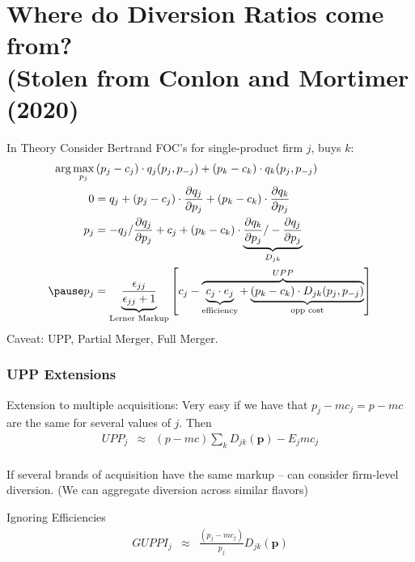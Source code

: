 \documentclass[xcolor=pdftex,dvipsnames,table,mathserif,aspectratio=169]{beamer}
\begin{document}
\section{Where do Diversion Ratios come from?\\ (Stolen from Conlon and Mortimer (2020)}
\begin{frame}{In Theory}
\footnotesize
Consider Bertrand FOC's for single-product firm $j$, buys $k$:
\begin{align*}
\arg \max_{p_j}&\, (p_j-c_j) \cdot q_j(p_j,p_{-j}) + (p_k-c_k) \cdot q_k(p_j,p_{-j})\\
0 &=q_j+ (p_j-c_j) \cdot \frac{\partial q_j}{\partial p_j}+ (p_k-c_k) \cdot  \frac{\partial q_k}{\partial p_j}\\
p_j &=-q_j/\frac{\partial q_j}{\partial p_j}+ c_j + (p_k-c_k) \cdot  \underbrace{\frac{\partial q_k}{\partial p_j}/-\frac{\partial q_j}{\partial p_j}}_{D_{jk}}\\ \pause
p_j &= \underbrace{\frac{\epsilon_{jj}}{\epsilon_{jj}+1}}_{\text{Lerner Markup}} \left[  c_j -\overbrace{ \underbrace{c_j \cdot e_j}_{\text{efficiency}} + \underbrace{(p_k-c_k) \cdot  D_{jk} (p_j,p_{-j})}_{\text{opp cost}}}^{UPP} \right]\\
\end{align*}
Caveat: UPP, Partial Merger, Full Merger.
\end{frame}


\begin{frame}
\frametitle{UPP Extensions}
\begin{block}{Extension to multiple acquisitions:}
Very easy if we have that $p_j - mc_j = p - mc$ are the same for several values of $j$.  Then
\begin{eqnarray*}
UPP_j &\approx& (p - mc) \sum_k D_{jk}(\mathbf{p}) -  E_j mc_j \\
\end{eqnarray*}
\end{block}
If several brands of acquisition have the same markup -- can consider firm-level diversion. (We can aggregate diversion across similar flavors)
\begin{block}{Ignoring Efficiencies}
\begin{eqnarray*}
GUPPI_j &\approx& \frac{(p_j - mc_j)}{p_j} D_{jk}(\mathbf{p}) \\
\end{eqnarray*}
\end{block}

\end{frame}
\end{document}
